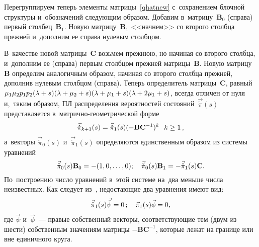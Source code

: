 \begin{multicols}{2}
Перегруппируем теперь элементы мат\-ри\-цы~\eqref{qhatnew} 
с~сохранением блочной структуры и~обозначений \mbox{сле\-ду\-ющим} образом.
Добавим в~мат\-ри\-цу~$\mathbf{B}_0$ (справа) первый столбец~$\mathbf{B}_1$. Новую мат\-ри\-цу~$\mathbf{B}_1$ 
<<начнем>> со второго столбца прежней и~дополним ее справа нулевым 
столбцом. 

В~качестве новой мат\-ри\-цы~$\mathbf{C}$ возьмем  прежнюю, но начиная со 
второго столбца, и~дополним ее (справа) первым столбцом прежней
мат\-ри\-цы~$\mathbf{B}$. Новую мат\-ри\-цу~$\mathbf{B}$ определим аналогичным образом, 
начиная со второго столбца прежней, дополнив нулевым столбцом (справа). Теперь 
определитель мат\-ри\-цы~$\mathbf{C}$,
равный $\mu_1 \mu_2 p_1 p_2  (\lambda\hm+s)(\lambda\hm+\mu_2\hm+s)(\lambda\hm+\mu_1\hm+s)(\lambda\hm+2\mu_1+s)$,
всегда отличен от нуля и,~таким образом, ПЛ распределения вероятностей состояний~$\vec{{\check \pi}}(s)$
представляется в~мат\-рич\-но-гео\-мет\-ри\-че\-ской форме
$$
{\vec{\check { \pi}}_{k+1}(s)\hm=\vec{\check { \pi}}_1(s)}(- \mathbf{B}\mathbf{C}^{-1})^{k}\,\enskip
{k\ge 1}\,,
$$
 а~векторы $\vec{\check { \pi}}_0(s)$ и~$\vec{\check { \pi}}_1(s)$
определяются единственным образом из системы уравнений
$$\vec{\check { \pi}}_0(s) \mathbf{B}_0 \hm= -(1,0,\dots,0);\quad
{\vec{\check { \pi}}_0(s)\mathbf{B}_1 \hm= - \vec{\check { \pi}}_1(s) \mathbf{C}}.
$$
По~построению число уравнений в~этой системе на~два меньше числа неизвестных.
Как следует из~\cite[теорема 4.1]{zhang}, недостающие два уравнения имеют вид:
$$
\vec{\check {\pi}}_1(s){\vec {\check \psi}}=0\,;\quad 
 \vec{{\pi}}_1(s){\vec {\phi}}\hm=0,
 $$
где $\vec {\psi}$ и~$\vec {\phi}$~--- правые собственный векторы,
соответствующие тем (двум из шести) собственным значениям матрицы ${ - \mathbf{B}\mathbf{C}^{-1}}$,
которые лежат на границе или вне единичного круга.


\end{multicols}
